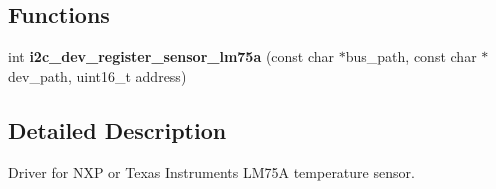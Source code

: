 \subsection*{Functions}
\begin{DoxyCompactItemize}
\item 
\mbox{\label{group__I2CSensorLM75A_gac7339effcd78f07e0c85574c0933d388}} 
int {\bfseries i2c\+\_\+dev\+\_\+register\+\_\+sensor\+\_\+lm75a} (const char $\ast$bus\+\_\+path, const char $\ast$dev\+\_\+path, uint16\+\_\+t address)
\end{DoxyCompactItemize}


\subsection{Detailed Description}
Driver for N\+XP or Texas Instruments L\+M75A temperature sensor. 

